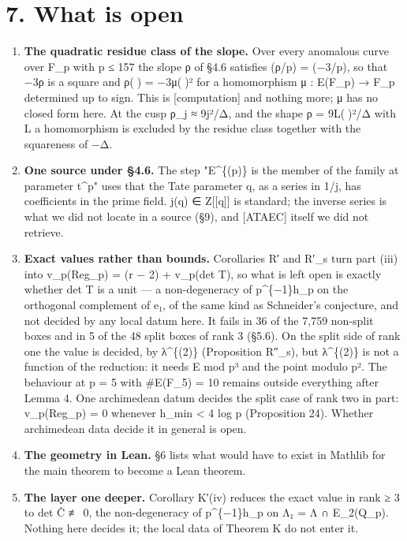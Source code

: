 \documentclass[11pt,a4paper]{article}
\theoremstyle{named}
\begin{document}
\section*{7. What is open}

\begin{enumerate}[leftmargin=1.4em,itemsep=.2em,topsep=.3em]
\item \textbf{The quadratic residue class of the slope.} Over every anomalous curve over F\_p with p ≤ 157 the slope ρ of §4.6 satisfies (ρ/p) = (−3/p), so that −3ρ is a square and ρ() = −3μ()² for a homomorphism μ : E(F\_p) → F\_p determined up to sign. This is [computation] and nothing more; μ has no closed form here. At the cusp ρ\_j ≈ 9j²/Δ, and the shape ρ = 9L()²/Δ with L a homomorphism is excluded by the residue class together with the squareness of −Δ.
\item \textbf{One source under §4.6.} The step "E\textasciicircum{}\{(p)\} is the member of the family at parameter t\textasciicircum{}p" uses that the Tate parameter q, as a series in 1/j, has coefficients in the prime field. j(q) ∈ Z[[q]] is standard; the inverse series is what we did not locate in a source (§9), and [ATAEC] itself we did not retrieve.
\item \textbf{Exact values rather than bounds.} Corollaries R′ and R′\_s turn part (iii) into v\_p(Reg\_p) = (r − 2) + v\_p(det T), so what is left open is exactly whether det T is a unit — a non-degeneracy of p\textasciicircum{}\{−1\}h\_p on the orthogonal complement of e₁, of the same kind as Schneider's conjecture, and not decided by any local datum here. It fails in 36 of the 7,759 non-split boxes and in 5 of the 48 split boxes of rank 3 (§5.6). On the split side of rank one the value is decided, by λ\textasciicircum{}\{(2)\} (Proposition R″\_s), but λ\textasciicircum{}\{(2)\} is not a function of the reduction: it needs E mod p³ and the point modulo p². The behaviour at p = 5 with \#E(F\_5) = 10 remains outside everything after Lemma 4. One archimedean datum decides the split case of rank two in part: v\_p(Reg\_p) = 0 whenever h\_min \textless{} 4 log p (Proposition 24). Whether archimedean data decide it in general is open.
\item \textbf{The geometry in Lean.} §6 lists what would have to exist in Mathlib for the main theorem to become a Lean theorem.
\item \textbf{The layer one deeper.} Corollary K′(iv) reduces the exact value in rank ≥ 3 to det Ĉ ≢ 0, the non-degeneracy of p\textasciicircum{}\{−1\}h\_p on Λ₁ = Λ ∩ E\_2(Q\_p). Nothing here decides it; the local data of Theorem K do not enter it.

\end{enumerate}
\end{document}
